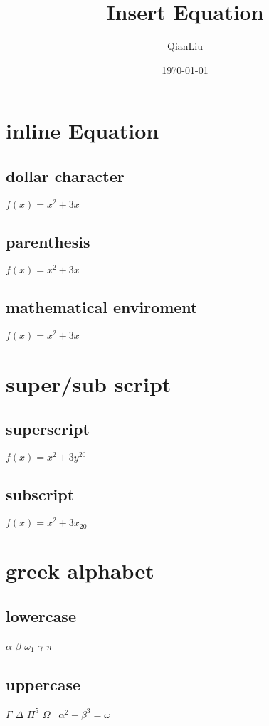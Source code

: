 \documentclass{article}
\author{QianLiu}
\title{Insert Equation}
\date{\today}
\begin{document}
    \maketitle
    \tableofcontents
    
    \section{inline Equation}
    \subsection{dollar character}
    $f(x)=x^2+3x$

    \subsection{parenthesis}
    \(f(x)=x^2+3x\)

    \subsection{mathematical enviroment}
    \begin{math}
        f(x)=x^2+3x
    \end{math}

    \section{super/sub script}
    \subsection{superscript}
    $f(x)=x^2+3y^{20}$

    \subsection{subscript}
    \(f(x)=x^2+3x_{20}\)
    \section{greek alphabet}
    \subsection{lowercase}
    \(\alpha\)
    \(\beta\)
    \(\omega_1\)
    \(\gamma\)
    \(\pi\)

    \subsection{uppercase}
    \(\Gamma\)
    \(\Delta\)
    \(\Pi^5\)
    \(\Omega\)
    \ \(\alpha^2+\beta^3=\omega\)
\end{document}
